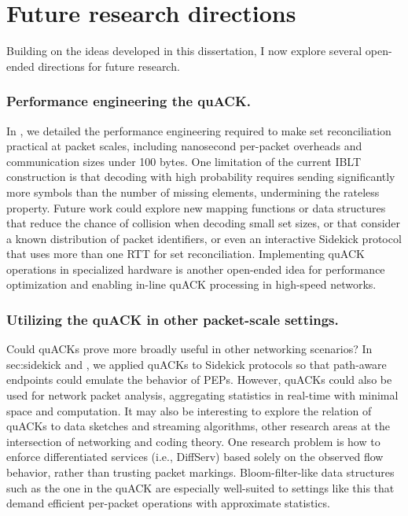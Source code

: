 \section{Future research directions}
\label{sec:conclusion:future}

Building on the ideas developed in this dissertation, I now explore several
open-ended directions for future research.

\subsubsection{Performance engineering the quACK.}

In , we detailed the performance engineering required to make
set reconciliation practical at packet scales, including nanosecond per-packet
overheads and communication sizes under 100 bytes. One limitation of the
current IBLT construction is that decoding with high probability requires
sending significantly more symbols than the number of missing elements,
undermining the rateless property. Future work could explore new mapping
functions or data structures that reduce the chance of collision when decoding
small set sizes, or that consider a known distribution of packet identifiers,
or even an interactive Sidekick protocol that uses more than one RTT for set
reconciliation. Implementing quACK operations in specialized hardware is
another open-ended idea for performance optimization and enabling in-line
quACK processing in high-speed networks.

\subsubsection{Utilizing the quACK in other packet-scale settings.}

Could quACKs prove more broadly useful in other networking scenarios? In \Cref
{sec:sidekick} and , we applied quACKs to Sidekick protocols
so that path-aware endpoints could emulate the behavior of PEPs. However,
quACKs could also be used for network packet analysis, aggregating statistics
in real-time with minimal space and computation. It may also be interesting to
explore the relation of quACKs to data sketches and streaming algorithms, other
research areas at the intersection of networking and coding theory. One
research problem is how to enforce differentiated services (i.e., DiffServ)
based solely on the observed flow behavior, rather than trusting packet
markings. Bloom-filter-like data structures such as the one in the quACK are
especially well-suited to settings like this that demand efficient per-packet
operations with approximate statistics.

